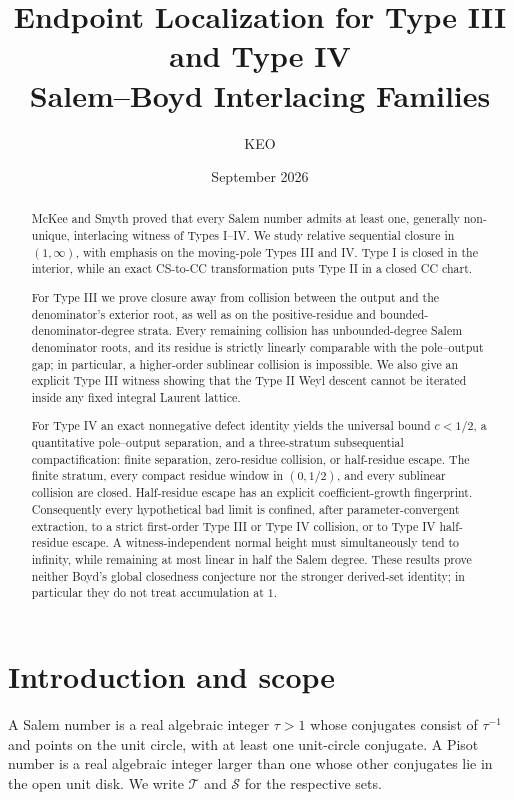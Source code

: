 \documentclass[11pt,reqno]{amsart}
\title[Salem--Boyd endpoint localization]{Endpoint Localization for Type III
and Type IV\\Salem--Boyd Interlacing Families}
\author{KEO}
\date{September 2026}
\theoremstyle{definition}
\theoremstyle{remark}
\newcommand{\calS}{\mathcal S}
\newcommand{\calT}{\mathcal T}
\begin{document}
\begin{abstract}
McKee and Smyth proved that every Salem number admits at least one, generally
non-unique, interlacing witness of Types I--IV.  We study relative sequential
closure in $(1,\infty)$, with emphasis on the moving-pole Types III and IV.
Type I is closed in the interior, while an exact CS-to-CC transformation puts
Type II in a closed CC chart.

For Type III we prove closure away from collision between the output and the
denominator's exterior root, as well as on the positive-residue and
bounded-denominator-degree strata.  Every remaining collision has
unbounded-degree Salem denominator roots, and its residue is strictly
linearly comparable with the pole--output gap; in particular, a higher-order
sublinear collision is impossible.  We also give an explicit Type III
witness showing that the Type II Weyl descent cannot be iterated inside any
fixed integral Laurent lattice.

For Type IV an exact nonnegative defect identity yields the universal bound
$c<1/2$, a quantitative pole--output separation, and a three-stratum
subsequential compactification: finite separation, zero-residue collision,
or half-residue escape.  The finite stratum, every compact residue window in
$(0,1/2)$, and every sublinear collision are closed.  Half-residue escape has
an explicit coefficient-growth fingerprint.  Consequently every
hypothetical bad limit is confined, after parameter-convergent extraction,
to a strict first-order Type III or Type IV collision, or to Type IV
half-residue escape.  A witness-independent normal height must simultaneously
tend to infinity, while remaining at most linear in half the Salem degree.
These results prove neither Boyd's global closedness conjecture nor the
stronger derived-set identity; in particular they do not treat accumulation
at $1$.
\end{abstract}

\maketitle

\section{Introduction and scope}

A Salem number is a real algebraic integer $\tau>1$ whose conjugates consist
of $\tau^{-1}$ and points on the unit circle, with at least one unit-circle
conjugate.  A Pisot number is a real algebraic integer larger than one whose
other conjugates lie in the open unit disk.  We write $\calT$ and $\calS$ for
the respective sets.
\end{document}
